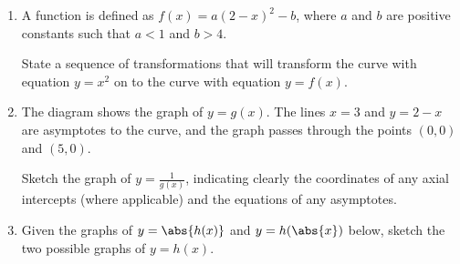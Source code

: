 \begin{problem}
    \begin{enumerate}
        \item A function is defined as $f(x) = a(2-x)^2 - b$, where $a$ and $b$ are positive constants such that $a < 1$ and $b > 4$.
        
        State a sequence of transformations that will transform the curve with equation $y = x^2$ on to the curve with equation $y = f(x)$.
        \item The diagram shows the graph of $y = g(x)$. The lines $x = 3$ and $y = 2 - x$ are asymptotes to the curve, and the graph passes through the points $(0, 0)$ and $(5, 0)$.
        
        \begin{center}
        \end{center}

        Sketch the graph of $y = \frac1{g(x)}$, indicating clearly the coordinates of any axial intercepts (where applicable) and the equations of any asymptotes.
        \item Given the graphs of $y = \abs{h(x)}$ and $y = h(\abs{x})$ below, sketch the two possible graphs of $y = h(x)$.
        

\end{enumerate}
\end{problem}
